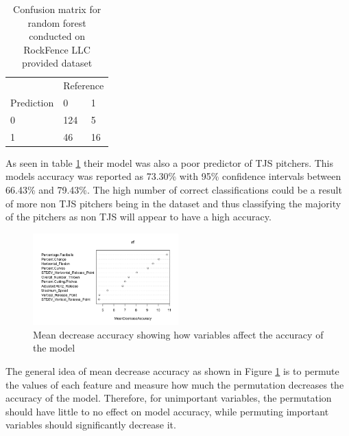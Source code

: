 \begin{table}[h]
\centering
\caption{Confusion matrix for random forest conducted on RockFence LLC provided dataset}
\label{tbl:rockfence}
\begin{tabular}{lll}
           & \multicolumn{2}{l}{Reference} \\
Prediction & 0              & 1            \\
0          & 124            & 5            \\
1          & 46             & 16
\end{tabular}
\end{table}

As seen in table \ref{tbl:rockfence} their model was also a poor predictor of TJS pitchers. This models accuracy was reported as 73.30\% with 95\% confidence intervals between 66.43\% and 79.43\%. The high number of correct classifications could be a result of more non TJS pitchers being in the dataset and thus classifying the majority of the pitchers as non TJS will appear to have a high accuracy.

\begin{figure}[h]
    \centering
        \includegraphics[width=0.5\textwidth]{meanDecreaseAccuracy}
    \caption{Mean decrease accuracy showing how variables affect the accuracy of the model}
    \label{fig:mda}
\end{figure}

The general idea of mean decrease accuracy as shown in Figure \ref{fig:mda} is to permute the values of each feature and measure how much the permutation decreases the accuracy of the model. Therefore, for unimportant variables, the permutation should have little to no effect on model accuracy, while permuting important variables should significantly decrease it.

